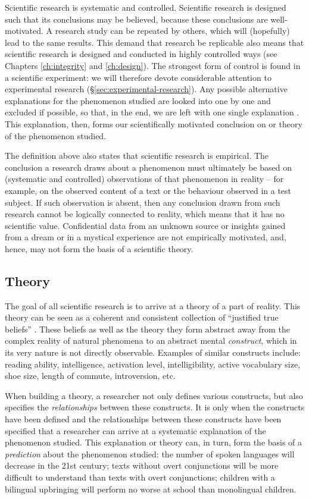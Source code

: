 \documentclass[
]{book}
\begin{document}
Scientific research is systematic and controlled. Scientific research is designed such that its conclusions may be believed, because these conclusions are well-motivated. A research study can be repeated by others, which will (hopefully) lead to the same results. This demand that research be replicable also means that scientific research is designed and conducted in highly controlled ways (see Chapters \ref{ch:integrity} and \ref{ch:design}).
The strongest form of control is found in a scientific experiment: we will therefore devote considerable attention to experimental research (§\ref{sec:experimental-research}). Any possible alternative explanations for the phenomenon studied are looked into one by one and excluded if possible, so that, in the end, we are left with one single explanation \citep{KL00}. This explanation, then, forms our scientifically motivated conclusion on or theory of the phenomenon studied.

The definition above also states that scientific research is empirical. The conclusion a research draws about a phenomenon must ultimately be based on (systematic and controlled) observations of that phenomenon in reality -- for example, on the observed content of a text or the behaviour observed in a test subject. If such observation is absent, then any conclusion drawn from such research cannot be logically connected to reality, which means that it has no scientific value. Confidential data from an unknown source or insights gained from a dream or in a mystical experience are not empirically motivated, and, hence, may not form the basis of a scientific theory.

\hypertarget{sec:theory}{%
\subsection{Theory}\label{sec:theory}}

The goal of all scientific research is to arrive at a theory of a part of reality. This theory can be seen as a coherent and consistent collection of ``justified true beliefs'' \citep{Mort03}. These beliefs as well as the theory they form abstract away from the complex reality of natural phenomena to an abstract mental \emph{construct}, which in its very nature is not directly observable. Examples of similar constructs include: reading ability, intelligence, activation level, intelligibility, active vocabulary size, shoe size, length of commute, introversion, etc.

When building a theory, a researcher not only defines various constructs, but also specifies the \emph{relationships} between these constructs. It is only when the constructs have been defined and the relationships between these constructs have been specified that a researcher can arrive at a systematic explanation of the phenomenon studied. This explanation or theory can, in turn, form the basis of a \emph{prediction} about the phenomenon studied: the number of spoken languages will decrease in the 21st century; texts without overt conjunctions will be more difficult to understand than texts with overt conjunctions; children with a bilingual upbringing will perform no worse at school than monolingual children.
\end{document}
